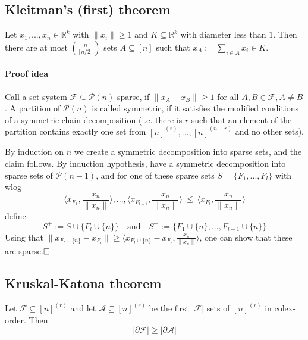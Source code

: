 \documentclass{scrartcl}
\newcommand{\R}{\mathbb{R}}
\begin{document}
\subsection{Kleitman's (first) theorem}
Let $x_1, ..., x_n \in \R^k$ with $\| x_i \| \geq 1$ and $K \subseteq \R^k$ with diameter less than $1$.
Then there are at most ${n \choose \lfloor n/2 \rfloor}$ sets $A \subseteq [n]$ such that $x_A := \sum_{i \in A} x_i \in K$.
\paragraph{Proof idea} Call a set system $\mathcal{F} \subseteq \mathcal{P}(n)$ sparse, if $\| x_A - x_B \| \geq 1$ for all $A, B \in \mathcal{F}, A \neq B$.
A partition of $\mathcal{P}(n)$ is called symmetric, if it satisfies the modified conditions of a symmetric chain decomposition 
(i.e. there is $r$ such that an element of the partition contains exactly one set from $[n]^{(r)}, ..., [n]^{(n - r)}$ and no other sets).

By induction on $n$ we create a symmetric decomposition into sparse sets, and the claim follows.
By induction hypothesis, have a symmetric decomposition into sparse sets of $\mathcal{P}(n - 1)$, and for one of these sparse sets $S = \{ F_1, ..., F_l \}$ with wlog
\begin{equation*}
    \langle x_{F_1}, \frac {x_n} {\| x_n \|} \rangle, ..., \langle x_{F_{l - 1}}, \frac {x_n} {\| x_n \|} \rangle \ \leq \ \langle x_{F_l}, \frac {x_n} {\| x_n \|} \rangle
\end{equation*}
define
\begin{equation*}
    S^+ := S \cup \{ F_l \cup \{n\} \} \quad \text{and} \quad S^- := \{ F_1 \cup \{n\}, ..., F_{l - 1} \cup \{n\} \}
\end{equation*}
Using that $\| x_{F_l \cup \{n\}} - x_{F_i} \| \geq \langle x_{F_l \cup \{n\}} - x_{F_i}, \frac {x_n} {\| x_n \|} \rangle$, one can show that these are sparse.$\hfill\square$

\subsection{Kruskal-Katona theorem}
Let $\mathcal{F} \subseteq [n]^{(r)}$ and let $\mathcal{A} \subseteq [n]^{(r)}$ be the first $|\mathcal{F}|$ sets of $[n]^{(r)}$ in colex-order. Then
\begin{equation*}
    |\partial\mathcal{F}| \geq |\partial\mathcal{A}|
\end{equation*}
\end{document}
